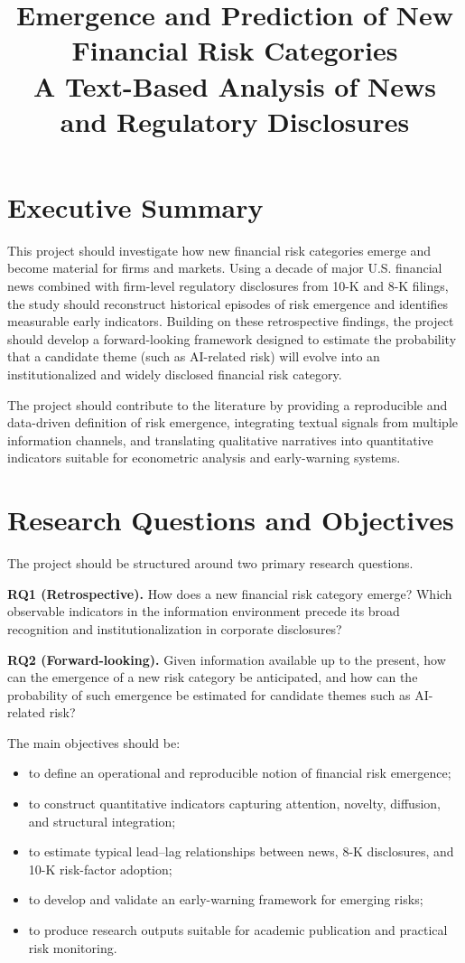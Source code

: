 \documentclass[11pt,a4paper]{article}
\title{\textbf{Emergence and Prediction of New Financial Risk Categories}\\
\vspace{0.3cm}
\large A Text-Based Analysis of News and Regulatory Disclosures}
\author{}
\date{}
\begin{document}
\maketitle

\section*{Executive Summary}

This project should investigate how new financial risk categories emerge and become material for firms and markets. Using a decade of major U.S. financial news combined with firm-level regulatory disclosures from 10-K and 8-K filings, the study should reconstruct historical episodes of risk emergence and identifies measurable early indicators. Building on these retrospective findings, the project should develop a forward-looking framework designed to estimate the probability that a candidate theme (such as AI-related risk) will evolve into an institutionalized and widely disclosed financial risk category.

The project should contribute to the literature by providing a reproducible and data-driven definition of risk emergence, integrating textual signals from multiple information channels, and translating qualitative narratives into quantitative indicators suitable for econometric analysis and early-warning systems.

\section{Research Questions and Objectives}

The project should be structured around two primary research questions.

\textbf{RQ1 (Retrospective).} How does a new financial risk category emerge? Which observable indicators in the information environment precede its broad recognition and institutionalization in corporate disclosures?

\textbf{RQ2 (Forward-looking).} Given information available up to the present, how can the emergence of a new risk category be anticipated, and how can the probability of such emergence be estimated for candidate themes such as AI-related risk?

The main objectives should be:
\begin{itemize}
\item to define an operational and reproducible notion of financial risk emergence;
\item to construct quantitative indicators capturing attention, novelty, diffusion, and structural integration;
\item to estimate typical lead--lag relationships between news, 8-K disclosures, and 10-K risk-factor adoption;
\item to develop and validate an early-warning framework for emerging risks;
\item to produce research outputs suitable for academic publication and practical risk monitoring.
\end{itemize}
\end{document}
